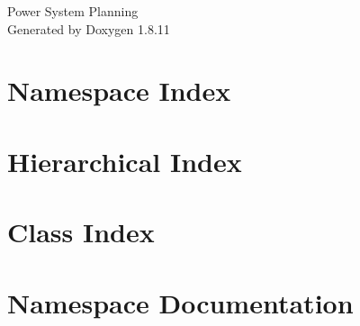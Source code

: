 \documentclass[twoside]{book}
\newcommand{\+}{\discretionary{\mbox{\scriptsize$\hookleftarrow$}}{}{}}
\newcommand{\clearemptydoublepage}{%
  \newpage{\pagestyle{empty}\cleardoublepage}%
}
\begin{document}
\hypersetup{pageanchor=false,
             bookmarksnumbered=true,
             pdfencoding=unicode
            }
\begin{titlepage}
\vspace*{7cm}
\begin{center}%
{\Large Power System Planning }\\
\vspace*{1cm}
{\large Generated by Doxygen 1.8.11}\\
\end{center}
\end{titlepage}
\clearemptydoublepage
\tableofcontents
\clearemptydoublepage
{}
\hypersetup{pageanchor=true}

\chapter{Namespace Index}

\chapter{Hierarchical Index}

\chapter{Class Index}

\chapter{Namespace Documentation}





\end{document}
